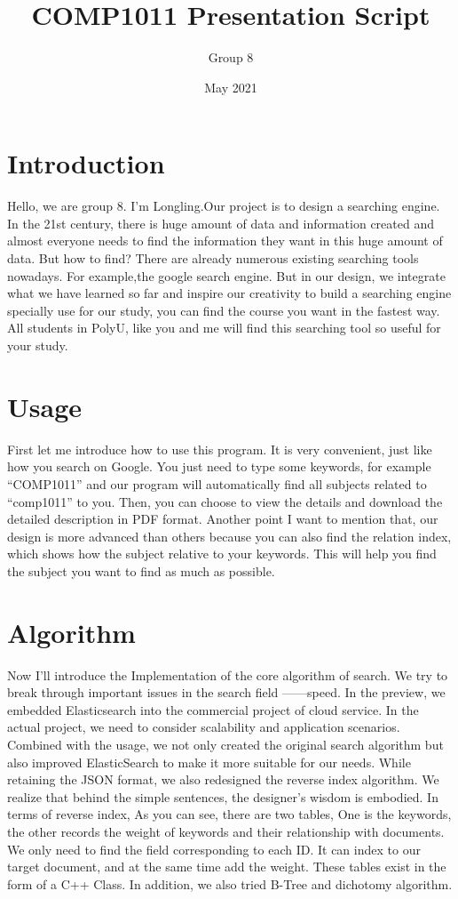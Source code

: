 \documentclass{article}
\title{COMP1011 Presentation Script}
\author{Group 8 }
\date{May 2021}
\begin{document}
\maketitle


\section{Introduction}
Hello, we are group 8. I'm Longling.Our project is to design a searching engine. 
In the 21st century, there is huge amount of data and information created 
and almost everyone needs to find the information they want in this huge amount of data.
But how to find? There are already numerous existing searching tools nowadays. 
For example,the google search engine. But in our design, we integrate what we have learned so far and inspire our creativity 
to build a searching engine specially use for our study, you can find the course you want in the fastest way.
All students in PolyU, like you and me will find this searching tool so useful for your study.

\section{Usage}
First let me introduce how to use this program. It is very convenient, just like how you search on Google. 
You just need to type some keywords, for example “COMP1011” and our program will automatically find 
all subjects related to “comp1011” to you. Then, you can choose to view the details and download 
the detailed description in PDF format. Another point I want to mention that, our design is more advanced than others
because you can also find the relation index, which shows how the subject relative to your keywords.
This will help you find the subject you want to find as much as possible.

\section{Algorithm}
Now I'll introduce the Implementation of the core algorithm of search. We try to break through important issues in the search field ——speed. In the preview, we embedded Elasticsearch into the commercial project of cloud service. In the actual project, we need to consider scalability and application scenarios. Combined with the usage, we not only created the original search algorithm but also improved ElasticSearch to make it more suitable for our needs. While retaining the JSON format, we also redesigned the reverse index algorithm. We realize that behind the simple sentences, the designer's wisdom is embodied. In terms of reverse index, As you can see, there are two tables, One is the keywords, the other records the weight of keywords and their relationship with documents. We only need to find the field corresponding to each ID. It can index to our target document, and at the same time add the weight. These tables exist in the form of a C++ Class. In addition, we also tried B-Tree and dichotomy algorithm.
\end{document}
